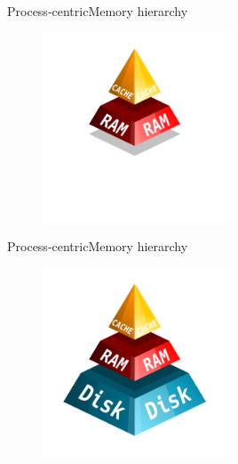 \documentclass[10pt]{beamer}
\begin{document}
\begin{frame}{Process-centric}{Memory hierarchy}
  \begin{figure}[ht]
    \centering
    \includegraphics[width=0.5\textwidth, keepaspectratio=true]{images/memory_hierarchy_ram_cache.png}
  \end{figure}
\end{frame}

\begin{frame}{Process-centric}{Memory hierarchy}
  \begin{figure}[ht]
    \centering
    \includegraphics[width=0.5\textwidth, keepaspectratio=true]{images/memory_hierarchy_disk_ram_cache.png}
  \end{figure}
\end{frame}

\end{document}
